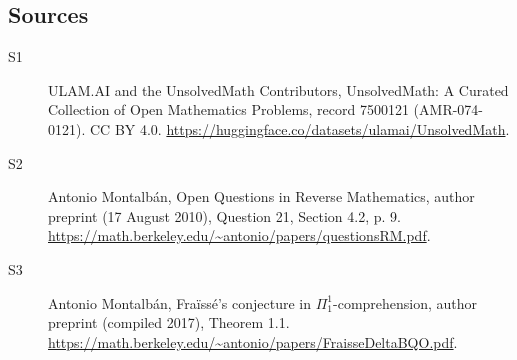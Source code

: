 \documentclass[11pt]{article}
\begin{document}
\subsection{Sources}
\begin{description}
\item[\hypertarget{source:7500121:1}{S1}] ULAM.AI and the UnsolvedMath Contributors, UnsolvedMath: A Curated Collection of Open Mathematics Problems, record 7500121 (AMR-074-0121). CC BY 4.0. \url{https://huggingface.co/datasets/ulamai/UnsolvedMath}.
\item[\hypertarget{source:7500121:2}{S2}] Antonio Montalbán, Open Questions in Reverse Mathematics, author preprint (17 August 2010), Question 21, Section 4.2, p. 9. \url{https://math.berkeley.edu/~antonio/papers/questionsRM.pdf}.
\item[\hypertarget{source:7500121:3}{S3}] Antonio Montalbán, Fraïssé's conjecture in $\Pi^1_1$-comprehension, author preprint (compiled 2017), Theorem 1.1. \url{https://math.berkeley.edu/~antonio/papers/FraisseDeltaBQO.pdf}.
\end{description}
\label{end:7500121}
\end{document}
